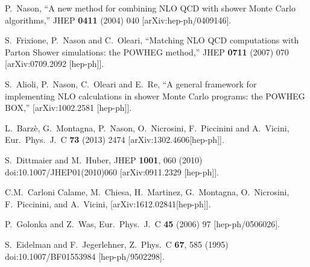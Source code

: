 \documentclass[paper]{JHEP3}
\begin{document}
\begin{thebibliography}{10}

  P.~Nason,
  ``A new method for combining NLO QCD with shower Monte Carlo algorithms,''
  JHEP {\bf 0411} (2004) 040
  [arXiv:hep-ph/0409146].

  S.~Frixione, P.~Nason and C.~Oleari,
``Matching NLO QCD computations with Parton Shower simulations: the POWHEG
method,''
  JHEP {\bf 0711} (2007) 070
  [arXiv:0709.2092 [hep-ph]].

  S.~Alioli, P.~Nason, C.~Oleari and E.~Re,
``A general framework for implementing NLO calculations in shower Monte Carlo
  programs: the POWHEG BOX,''
  [arXiv:1002.2581 [hep-ph]].

  L.~Barz\`e, G.~Montagna, P.~Nason, O.~Nicrosini, F.~Piccinini and 
  A.~Vicini, 
  Eur.\ Phys.\ J.\ C {\bf 73} (2013) 2474  
  [arXiv:1302.4606[hep-ph]].


  S.~Dittmaier and M.~Huber,
  JHEP {\bf 1001}, 060 (2010)
  doi:10.1007/JHEP01(2010)060
  [arXiv:0911.2329 [hep-ph]].
  

  
  C.M.~Carloni Calame, M.~Chiesa, H.~Martinez, 
  G.~Montagna, O.~Nicrosini, F.~Piccinini, and A.~Vicini, 
  [arXiv:1612.02841[hep-ph]].

  P.~Golonka and Z.~Was,
  Eur.\ Phys.\ J.\ C {\bf 45} (2006) 97
  [hep-ph/0506026].

  S.~Eidelman and F.~Jegerlehner,
  Z.\ Phys.\ C {\bf 67}, 585 (1995)
  doi:10.1007/BF01553984
  [hep-ph/9502298].




\end{thebibliography}
\end{document}

